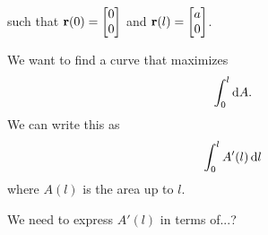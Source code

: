 such that $\mathbf{r}(0) = \begin{bmatrix}0\\0\end{bmatrix}$ and $\mathbf{r}(l) = \begin{bmatrix}a\\0\end{bmatrix}$.

We want to find a curve that maximizes
\begin{align*}
  \int_0^l \d A.
\end{align*}
We can write this as
\begin{align*}
  \int_0^l A'(l) \d l
\end{align*}
where $A(l)$ is the area up to $l$.

We need to express $A'(l)$ in terms of...?

